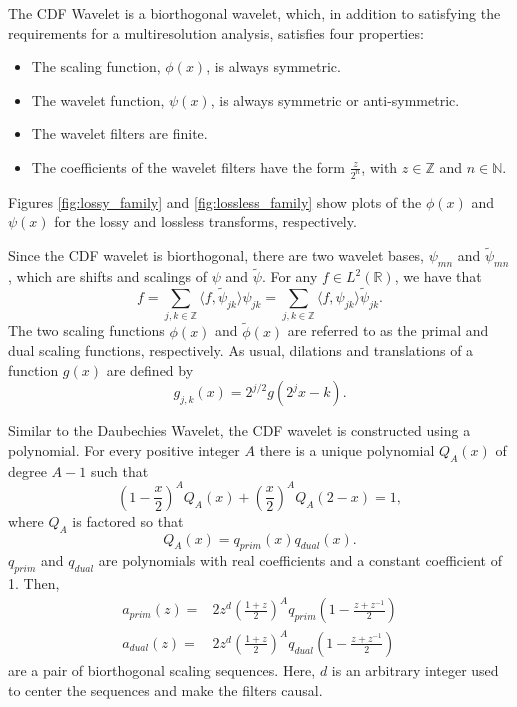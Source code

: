 \documentclass[titlepage,12pt]{article}
\begin{document}
The CDF Wavelet is a biorthogonal wavelet, which, in addition to satisfying the requirements for a multiresolution analysis,
satisfies four properties\cite{old}:
\begin{itemize}
	\item The scaling function, $\phi(x)$, is always symmetric.
	\item The wavelet function, $\psi(x)$, is always symmetric or anti-symmetric.
	\item The wavelet filters are finite.
	\item The coefficients of the wavelet filters have the form $\frac{z}{2^n}$, with $z\in\mathbb{Z}$ and $n\in\mathbb{N}$.
\end{itemize}
Figures \ref{fig:lossy_family} and \ref{fig:lossless_family} show plots of the $\phi(x)$
and $\psi(x)$ for the lossy and lossless transforms, respectively.

Since the CDF wavelet is biorthogonal, there are two wavelet bases, $\psi_{mn}$ and $\tilde{\psi}_{mn}$,
which are shifts and scalings of $\psi$ and $\tilde{\psi}$.\cite{cdf}
For any $f\in L^2(\mathbb{R})$, we have that
\begin{equation}
	f = \sum_{j,k\in\mathbb{Z}}\langle f,\tilde{\psi}_{jk}\rangle\psi_{jk}=\sum_{j,k\in\mathbb{Z}}\langle f,\psi_{jk}\rangle\tilde{\psi}_{jk}.
\end{equation}
The two scaling functions $\phi(x)$ and $\tilde{\phi}(x)$ are referred to 
as the primal and dual scaling functions, respectively.\cite{cdfwhat}
As usual, dilations and translations of a function $g(x)$ are defined by 
\[g_{j,k}(x)=2^{j/2}g(2^jx-k).\]

Similar to the Daubechies Wavelet, the CDF wavelet is constructed using a polynomial.
For every positive integer $A$ there is a unique polynomial $Q_A(x)$ of degree $A-1$ such that
\[(1-\frac{x}{2})^AQ_A(x)+(\frac{x}{2})^AQ_A(2-x)=1,\]
where $Q_A$ is factored so that
\[Q_A(x)=q_{prim}(x)q_{dual}(x).\]
$q_{prim}$ and $q_{dual}$ are polynomials with real coefficients and a constant coefficient of 1.
Then,
\begin{align*}
	a_{prim}(z) =& 2z^d(\frac{1+z}{2})^Aq_{prim}(1-\frac{z+z^{-1}}{2}) \\
	a_{dual}(z) =& 2z^d(\frac{1+z}{2})^Aq_{dual}(1-\frac{z+z^{-1}}{2})
\end{align*}
are a pair of biorthogonal scaling sequences.
Here, $d$ is an arbitrary integer used to center the sequences and make the filters causal.
\end{document}
